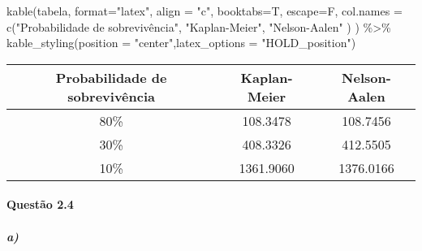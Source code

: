 \documentclass[
]{article}
\newenvironment{Shaded}{\begin{snugshade}}{\end{snugshade}}
\newcommand{\AttributeTok}[1]{\textcolor[rgb]{0.77,0.63,0.00}{#1}}
\newcommand{\FunctionTok}[1]{\textcolor[rgb]{0.00,0.00,0.00}{#1}}
\newcommand{\NormalTok}[1]{#1}
\newcommand{\SpecialCharTok}[1]{\textcolor[rgb]{0.00,0.00,0.00}{#1}}
\newcommand{\StringTok}[1]{\textcolor[rgb]{0.31,0.60,0.02}{#1}}
\begin{document}
\begin{Shaded}
\begin{Highlighting}[]
\FunctionTok{kable}\NormalTok{(tabela,}
      \AttributeTok{format=}\StringTok{"latex"}\NormalTok{,}
      \AttributeTok{align =} \StringTok{"c"}\NormalTok{,}
      \AttributeTok{booktabs=}\NormalTok{T,}
      \AttributeTok{escape=}\NormalTok{F,}
      \AttributeTok{col.names =} \FunctionTok{c}\NormalTok{(}\StringTok{"Probabilidade de sobrevivência"}\NormalTok{,}
                    \StringTok{"Kaplan{-}Meier"}\NormalTok{,}
                           \StringTok{"Nelson{-}Aalen"}
\NormalTok{                    )}
\NormalTok{      ) }\SpecialCharTok{\%\textgreater{}\%}
  \FunctionTok{kable\_styling}\NormalTok{(}\AttributeTok{position =} \StringTok{"center"}\NormalTok{,}\AttributeTok{latex\_options =} \StringTok{"HOLD\_position"}\NormalTok{)}
\end{Highlighting}
\end{Shaded}

\begin{table}[H]
\centering
\begin{tabular}{ccc}
\toprule
Probabilidade de sobrevivência & Kaplan-Meier & Nelson-Aalen\\
\midrule
80\% & 108.3478 & 108.7456\\
30\% & 408.3326 & 412.5505\\
10\% & 1361.9060 & 1376.0166\\
\bottomrule
\end{tabular}
\end{table}

\pagebreak

\hypertarget{questuxe3o-2.4-1}{%
\paragraph{Questão 2.4}\label{questuxe3o-2.4-1}}

\hypertarget{a-3}{%
\subparagraph{a)}\label{a-3}}

\hspace{2 pt}
\end{document}
